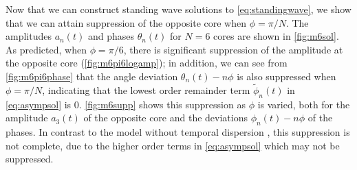 \documentclass[11pt,reqno]{amsart}
\begin{document}
Now that we can construct standing wave solutions to \cref{eq:standingwave}, we show that we can attain suppression of the opposite core when $\phi=\pi/N$. The amplitudes $a_n(t)$ and phases $\theta_n(t)$ for $N=6$ cores are shown in \cref{fig:m6sol}. As predicted, when $\phi=\pi/6$, there is significant suppression of the amplitude at the opposite core (\cref{fig:m6pi6logamp}); in addition, we can see from \cref{fig:m6pi6phase} that the angle deviation $\theta_n(t) - n \phi$ is also suppressed when $\phi=\pi/N$, indicating that the lowest order remainder term $\tilde{\phi}_n(t)$ in \cref{eq:asympsol} is 0. \cref{fig:m6supp} shows this suppression as $\phi$ is varied, both for the amplitude $a_3(t)$ of the opposite core and the deviations $\phi_n(t) - n \phi$ of the phases. In contrast to the model without temporal dispersion \cite{parker2021}, this suppression is not complete, due to the higher order terms in \cref{eq:asympsol} which may not be suppressed.
\end{document}
